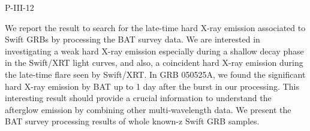 P-III-12


\bigskip



\bigskip

\noindent We report the result to search for the late-time hard X-ray emission 
associated to Swift GRBs by processing the BAT survey data.  We are 
interested in investigating a weak hard X-ray emission especially during 
a shallow decay phase in the Swift/XRT light curves, and also, a coincident 
hard X-ray emission during the late-time flare seen by Swift/XRT.  In 
GRB 050525A, we found the significant hard X-ray emission by BAT up to 1 day 
after the burst in our processing.  This interesting result should provide 
a crucial information to understand the afterglow emission by combining 
other multi-wavelength data.  We present the BAT survey processing 
results of whole known-z Swift GRB samples.
